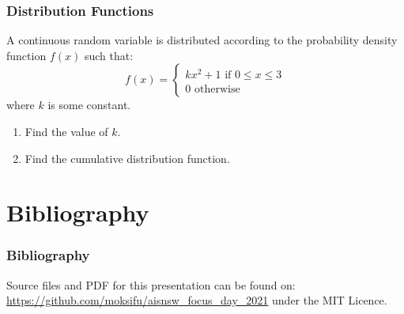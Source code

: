 \documentclass{beamer}
\begin{document}
\begin{frame}
  \frametitle{Distribution Functions}
  A continuous random variable is distributed according to the probability density function $f(x)$ such that:
  \[f(x) = \left \{ \begin{matrix} kx^2+1 \mbox{ if } 0 \leq x \leq 3 \\ 0 \mbox{ otherwise }\end{matrix} \right.\]
    where $k$ is some constant.
  \begin{enumerate}
    \item Find the value of $k$.
    \item Find the cumulative distribution function.
  \end{enumerate}
\end{frame}


\section{Bibliography}


\begin{frame}
  \frametitle{Bibliography}
  \printbibliography

  Source files and PDF for this presentation can be found on:
  \url{https://github.com/moksifu/aisnsw_focus_day_2021}
  under the MIT Licence.
\end{frame}


\end{document}
